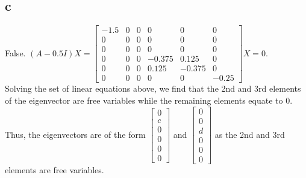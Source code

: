 \documentclass[twoside]{homework}
\begin{document}
\subsection*{c}
False. $(A - 0.5I)X = 
\begin{bmatrix}
    -1.5 & 0 & 0 & 0 & 0 & 0 \\
    0 & 0 & 0 & 0 & 0 & 0 \\
    0 & 0 & 0 & 0 & 0 & 0 \\
    0 & 0 & 0 & -0.375 & 0.125 & 0 \\
    0 & 0 & 0 & 0.125 & -0.375 & 0 \\
    0 & 0 & 0 & 0 & 0 & -0.25
\end{bmatrix}X = 0$.
\\
Solving the set of linear equations above, we find that the 2nd and 3rd elements of the eigenvector are free variables while the remaining elements equate to 0. 
\\
Thus, the eigenvectors are of the form $\begin{bmatrix}
    0 \\
    c \\
    0 \\
    0 \\
    0 \\
    0
\end{bmatrix}$ and 
$\begin{bmatrix}
    0 \\
    0 \\
    d \\
    0 \\
    0 \\
    0
\end{bmatrix}$ as the 2nd and 3rd elements are free variables.
\end{document}
